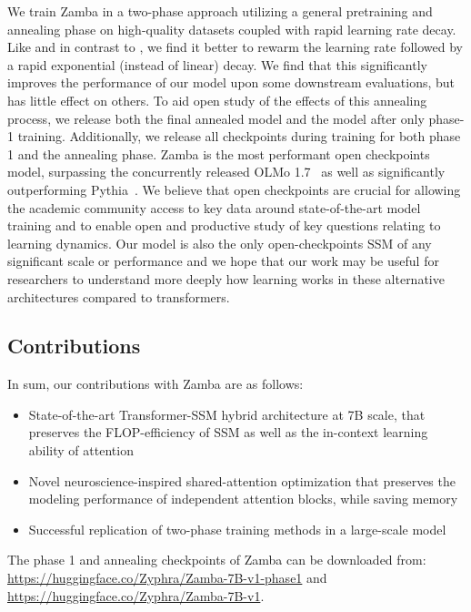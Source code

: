 We train Zamba in a two-phase approach utilizing a general pretraining and annealing phase on high-quality datasets coupled with rapid learning rate decay. Like \citet{ibrahim2024simple} and in contrast to \citet{hu2024minicpm}, we find it better to rewarm the learning rate followed by a rapid exponential (instead of linear) decay. We find that this significantly improves the performance of our model upon some downstream evaluations, but has little effect on others. To aid open study of the effects of this annealing process, we release both the final annealed model and the model after only phase-1 training. Additionally, we release all checkpoints during training for both phase 1 and the annealing phase. Zamba is the most performant open checkpoints model, surpassing the concurrently released OLMo 1.7~\citep{olmo-1.7} as well as significantly outperforming Pythia~\citep{biderman2023pythia}. We believe that open checkpoints are crucial for allowing the academic community access to key data around state-of-the-art model training and to enable open and productive study of key questions relating to learning dynamics. Our model is also the only open-checkpoints SSM of any significant scale or performance and we hope that our work may be useful for researchers to understand more deeply how learning works in these alternative architectures compared to transformers.

\subsection{Contributions}
\label{sec:contributions}

In sum, our contributions with Zamba are as follows:

\begin{itemize}
    \item State-of-the-art Transformer-SSM hybrid architecture at 7B scale, that preserves the FLOP-efficiency of SSM as well as the in-context learning ability of attention \item Novel neuroscience-inspired shared-attention optimization that preserves the modeling performance of independent attention blocks, while saving memory \item Successful replication of two-phase training methods in a large-scale model
\end{itemize}

The phase 1 and annealing checkpoints of Zamba can be downloaded from: \href{https://huggingface.co/Zyphra/Zamba-7B-v1-phase1}{https://huggingface.co/Zyphra/Zamba-7B-v1-phase1} and \href{https://huggingface.co/Zyphra/Zamba-7B-v1}{https://huggingface.co/Zyphra/Zamba-7B-v1}.

